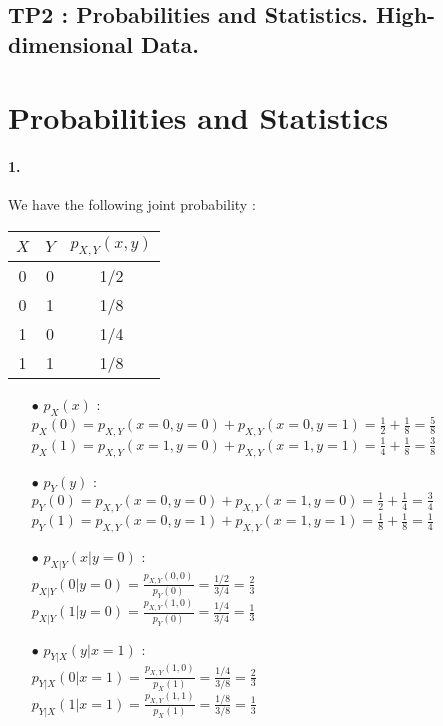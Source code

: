 \documentclass[14pt]
{article}
\begin{document}
\pagestyle{fancy}

\begin{center}
	\section*{\textbf{{\LARGE TP2 : Probabilities and Statistics. High-dimensional Data.}}}
\end{center}
\bigskip\bigskip\bigskip

\section{Probabilities and Statistics} %
\bigskip
\paragraph*{1.} We have the following joint probability :\\
\begin{center}
\begin{tabular}{c||c|c}
\hline 
 $X$ & $Y$ & $p_{X,Y}(x,y)$ \\ 	
\hline 
 0 & 0 & 1/2 \\ 
0 & 1 & 1/8 \\ 
1 & 0 & 1/4 \\ 
1 & 1 & 1/8 \\ 
\hline 
\end{tabular} 
\end{center}

\begin{itemize}
\item[$\bullet$] $p_{X}(x)$ : \\
$p_{X}(0)=p_{X,Y}(x=0,y=0)+p_{X,Y}(x=0,y=1)=\frac{1}{2}+\frac{1}{8}=\frac{5}{8}$\\
$p_{X}(1)=p_{X,Y}(x=1,y=0)+p_{X,Y}(x=1,y=1)=\frac{1}{4}+\frac{1}{8}=\frac{3}{8}$\\
\item[$\bullet$] $p_{Y}(y)$ : \\
$p_{Y}(0)=p_{X,Y}(x=0,y=0)+p_{X,Y}(x=1,y=0)=\frac{1}{2}+\frac{1}{4}=\frac{3}{4}$\\
$p_{Y}(1)=p_{X,Y}(x=0,y=1)+p_{X,Y}(x=1,y=1)=\frac{1}{8}+\frac{1}{8}=\frac{1}{4}$\\
\item[$\bullet$] $p_{X|Y}(x|y=0)$ :\\
$p_{X|Y}(0|y=0)=\frac{p_{X,Y}(0,0)}{p_{Y}(0)}=\frac{1/2}{3/4}=\frac{2}{3}$\\
$p_{X|Y}(1|y=0)=\frac{p_{X,Y}(1,0)}{p_{Y}(0)}=\frac{1/4}{3/4}=\frac{1}{3}$\\
\item[$\bullet$] $p_{Y|X}(y|x=1)$ :\\
$p_{Y|X}(0|x=1)=\frac{p_{X,Y}(1,0)}{p_{X}(1)}=\frac{1/4}{3/8}=\frac{2}{3}$\\
$p_{Y|X}(1|x=1)=\frac{p_{X,Y}(1,1)}{p_{X}(1)}=\frac{1/8}{3/8}=\frac{1}{3}$\\
\end{itemize}
\end{document}
